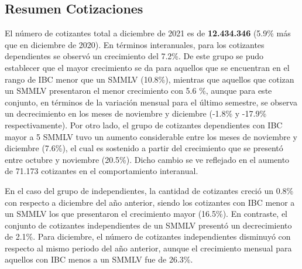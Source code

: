 \FloatBarrier

\subsection{Resumen Cotizaciones}

El número de cotizantes total a diciembre de 2021 es de \textbf{12.434.346} (5.9\% más que en diciembre de 2020). En términos interanuales, para los cotizantes dependientes se observó un crecimiento del 7.2\%. De este grupo se pudo establecer que el mayor crecimiento se da para aquellos que se encuentran en el rango de IBC menor que un SMMLV (10.8\%), mientras que aquellos que cotizan un SMMLV presentaron el menor crecimiento con 5.6 \%, aunque para este conjunto, en términos de la variación mensual para el último semestre, se observa un decrecimiento en los meses de noviembre y diciembre (-1.8\% y -17.9\% respectivamente). Por otro lado, el grupo de cotizantes dependientes con IBC mayor a 5 SMMLV tuvo un aumento considerable entre los meses de noviembre y diciembre (7.6\%), el cual es sostenido a partir del crecimiento que se presentó entre octubre y noviembre (20.5\%). Dicho cambio se ve reflejado en el aumento de 71.173 cotizantes en el comportamiento interanual.

En el caso del grupo de independientes, la cantidad de cotizantes creció un 0.8\% con respecto a diciembre del año anterior, siendo los cotizantes con IBC menor a un SMMLV los que presentaron el crecimiento mayor (16.5\%). En contraste, el conjunto de cotizantes independientes de un SMMLV presentó un decrecimiento de 2.1\%. Para diciembre, el número de cotizantes independientes disminuyó con respecto al mismo periodo del año anterior, aunque el crecimiento mensual para aquellos con IBC menos a un SMMLV fue de 26.3\%.

